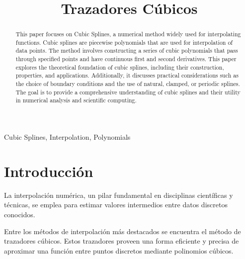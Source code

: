 \documentclass[conference]{IEEEtran}
\begin{document}
\title{Trazadores Cúbicos\\}

\author{
	}

\maketitle




\begin{abstract} This paper focuses on Cubic Splines, a numerical method
	widely used for interpolating functions. Cubic splines are piecewise
	polynomials that are used for interpolation of data points. The method
	involves constructing a series of cubic polynomials that pass through
	specified points and have continuous first and second derivatives. This
	paper explores the theoretical foundation of cubic splines, including
	their construction, properties, and applications. Additionally, it
	discusses practical considerations such as the choice of boundary
	conditions and the use of natural, clamped, or periodic splines. The goal
	is to provide a comprehensive understanding of cubic splines and their
	utility in numerical analysis and scientific computing.
\end{abstract}

\begin{IEEEkeywords}
	Cubic Splines, Interpolation, Polynomials
\end{IEEEkeywords}

\nocite{Trazadores_cúbicos_2014}

\section{Introducción}

La interpolación numérica, un pilar fundamental en disciplinas científicas y
técnicas, se emplea para estimar valores intermedios entre datos discretos
conocidos.

Entre los métodos de interpolación más destacados se encuentra
el método de trazadores cúbicos. Estos trazadores proveen una forma eficiente
y precisa de aproximar una función entre puntos discretos mediante polinomios
cúbicos.
\end{document}
